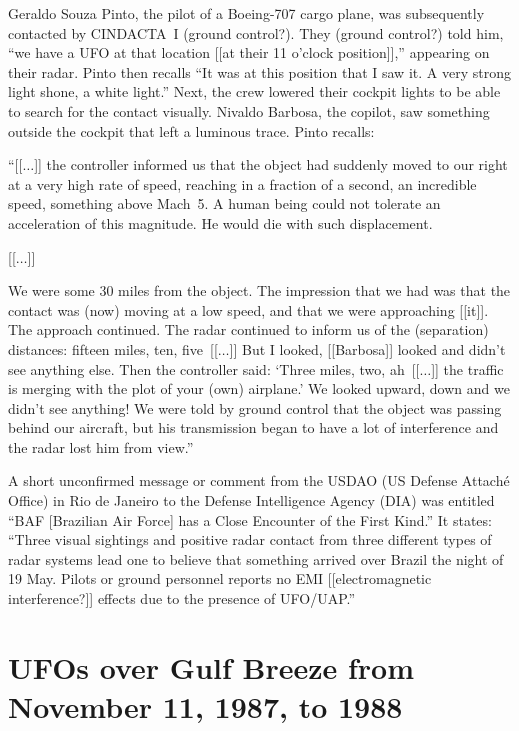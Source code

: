 Geraldo Souza Pinto, the pilot of a Boeing-707 cargo plane, was subsequently contacted by CINDACTA~I (ground control?).
They (ground control?) told him, ``we have a UFO at that location [[at their 11 o'clock position]],'' appearing on their radar.
Pinto then recalls
``It was at this position that I saw it. A very strong light shone, a white light.''
Next, the crew lowered their cockpit lights to be able to search for the contact visually.
Nivaldo Barbosa, the copilot, saw something outside the cockpit that left a luminous trace.
Pinto recalls:
\begin{svgraybox}
``[[$\ldots$]]
the controller informed us that the object had suddenly moved to our right at a very
high rate of speed, reaching in a fraction of a second, an incredible speed, something above
Mach~5. A human being could not tolerate an acceleration of this magnitude. He would die
with such displacement.

[[$\ldots$]]

We were some 30 miles from the object. The impression that we had was that
the contact was (now) moving at a low speed, and that we were approaching [[it]].
The approach continued. The radar continued to inform us of the (separation) distances:
fifteen miles, ten, five~[[$\ldots$]]
But I looked, [[Barbosa]] looked and didn't see anything else. Then
the controller said: `Three miles, two, ah~[[$\ldots$]] the traffic is merging with the plot of your
(own) airplane.' We looked upward, down and we didn't see anything! We were told by
ground control that the object was passing behind our aircraft, but his transmission began to
have a lot of interference and the radar lost him from view.''
\end{svgraybox}


A short unconfirmed message or comment from the USDAO (US Defense Attach\'e Office) in Rio de Janeiro to the Defense Intelligence Agency (DIA) was entitled~\cite{Brazil86} ``BAF [Brazilian Air Force] has a Close Encounter of the First Kind.'' It states: ``Three visual sightings and positive radar contact from three different types of radar systems lead one to believe that something arrived over Brazil the night of 19 May. Pilots or ground personnel reports no EMI [[electromagnetic interference?]] effects due to the presence of UFO/UAP.''


\section{UFOs over Gulf Breeze from November 11, 1987, to 1988}
\label{2023-UFO-chapter-History--1953-2016-gbui}

